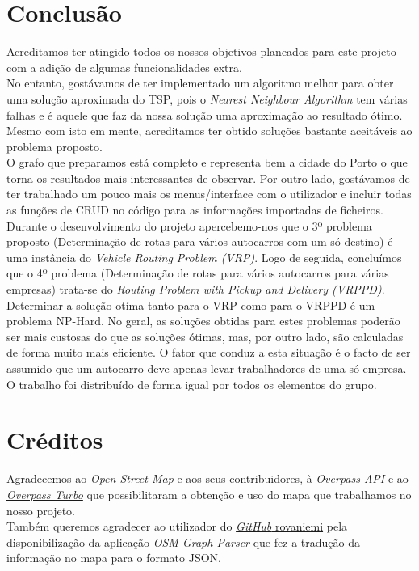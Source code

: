 \documentclass{report}
\begin{document}
\chapter{Conclusão}
  Acreditamos ter atingido todos os nossos objetivos planeados para este projeto
  com a adição de algumas funcionalidades extra.\\
  No entanto, gostávamos de ter implementado um algoritmo melhor para obter
  uma solução aproximada do TSP\cite{TSP}, pois o
  \textit{Nearest Neighbour Algorithm}\cite{NNA} tem várias falhas e é aquele
  que faz da nossa solução uma aproximação ao resultado ótimo. Mesmo com isto
  em mente, acreditamos ter obtido soluções bastante aceitáveis ao problema
  proposto.\\
  O grafo que preparamos está completo e representa bem a cidade do Porto o que
  torna os resultados mais interessantes de observar. Por outro lado, gostávamos
  de ter trabalhado um pouco mais os menus/interface com o utilizador e incluir
  todas as funções de CRUD no código para as informações importadas de ficheiros.\\
  Durante o desenvolvimento do projeto apercebemo-nos que o 3º problema proposto 
  (Determinação de rotas para vários autocarros com um só destino) é
  uma instância do \textit{Vehicle Routing Problem (VRP)\cite{VRP}}. Logo de seguida, concluímos
  que o 4º problema (Determinação de rotas para vários autocarros para várias empresas)
  trata-se do \textit{Routing Problem with Pickup and Delivery (VRPPD)\cite{VRP}}. Determinar a
  solução otíma tanto para o VRP como para o VRPPD é um problema NP-Hard\cite{VRP}.
  No geral, as soluções obtidas para estes problemas poderão ser mais custosas do que as soluções ótimas,
  mas, por outro lado, são calculadas de forma muito mais eficiente.
  O fator que conduz a esta situação é o facto de ser assumido que um autocarro deve apenas levar
  trabalhadores de uma só empresa.\\
  O trabalho foi distribuído de forma igual por todos os elementos do grupo.

\newpage
\chapter{Créditos}
Agradecemos ao \href{https://www.openstreetmap.org}{\textit{Open Street Map}}
e aos seus contribuidores, à
\href{https://wiki.openstreetmap.org/wiki/Overpass_API}{\textit{Overpass API}}
e ao \href{https://overpass-turbo.eu/}{\textit{Overpass Turbo}} que
possibilitaram a obtenção e uso do mapa que trabalhamos no nosso projeto.\\
\newline
Também queremos agradecer ao utilizador do
\href{https://github.com/rovaniemi}{\textit{GitHub} rovaniemi} pela
disponibilização da aplicação
\href{https://github.com/rovaniemi/osm-graph-parser}{\textit{OSM Graph Parser}}
que fez a tradução da informação no mapa para o formato JSON.

\newpage


\end{document}

